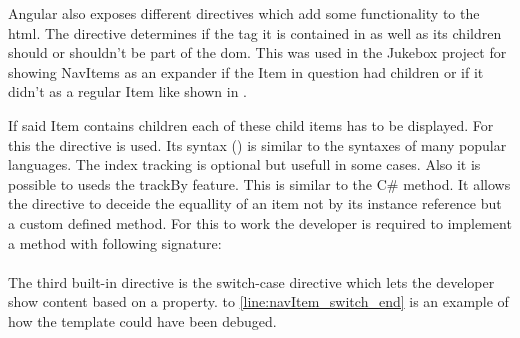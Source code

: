 
Angular also exposes different directives which add some functionality to the \gls{html}. The  directive determines if the tag it is contained in as well as its children should or shouldn't be part of the \gls{dom}. This was used in the Jukebox project for showing NavItems as an expander if the Item in question had children or if it didn't as a regular Item like shown in .

If said Item contains children each of these child items has to be displayed. For this the  directive is used. Its syntax () is similar to the  syntaxes of many popular languages. The index tracking is optional but usefull in some cases. Also it is possible to useds the trackBy feature. This is similar to the  C\# method. It allows the  directive to deceide the equallity of an item not by its instance reference but a custom defined method. For this to work the developer is required to implement a method with following signature:\\
\\

The third built-in directive is the switch-case directive which lets the developer show content based on a property.  to \ref{line:navItem_switch_end} is an example of how the  template could have been debuged.

\cite{angularTemplateSyntax}



